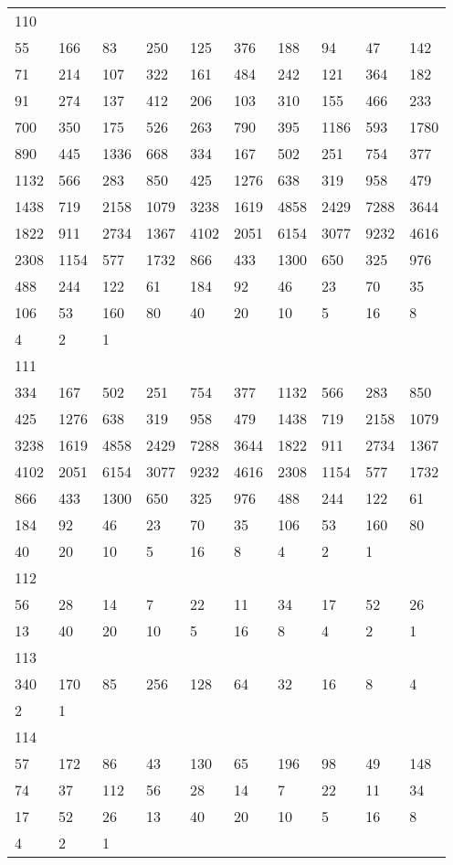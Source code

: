 \begin{longtable}{*{10}{l}}
110&&&&&&&&&\\
55& 166& 83& 250& 125& 376& 188& 94& 47& 142\\
71& 214& 107& 322& 161& 484& 242& 121& 364& 182\\
91& 274& 137& 412& 206& 103& 310& 155& 466& 233\\
700& 350& 175& 526& 263& 790& 395& 1186& 593& 1780\\
890& 445& 1336& 668& 334& 167& 502& 251& 754& 377\\
1132& 566& 283& 850& 425& 1276& 638& 319& 958& 479\\
1438& 719& 2158& 1079& 3238& 1619& 4858& 2429& 7288& 3644\\
1822& 911& 2734& 1367& 4102& 2051& 6154& 3077& 9232& 4616\\
2308& 1154& 577& 1732& 866& 433& 1300& 650& 325& 976\\
488& 244& 122& 61& 184& 92& 46& 23& 70& 35\\
106& 53& 160& 80& 40& 20& 10& 5& 16& 8\\
4& 2& 1& \\

111&&&&&&&&&\\
334& 167& 502& 251& 754& 377& 1132& 566& 283& 850\\
425& 1276& 638& 319& 958& 479& 1438& 719& 2158& 1079\\
3238& 1619& 4858& 2429& 7288& 3644& 1822& 911& 2734& 1367\\
4102& 2051& 6154& 3077& 9232& 4616& 2308& 1154& 577& 1732\\
866& 433& 1300& 650& 325& 976& 488& 244& 122& 61\\
184& 92& 46& 23& 70& 35& 106& 53& 160& 80\\
40& 20& 10& 5& 16& 8& 4& 2& 1& \\

112&&&&&&&&&\\
56& 28& 14& 7& 22& 11& 34& 17& 52& 26\\
13& 40& 20& 10& 5& 16& 8& 4& 2& 1\\

113&&&&&&&&&\\
340& 170& 85& 256& 128& 64& 32& 16& 8& 4\\
2& 1& \\

114&&&&&&&&&\\
57& 172& 86& 43& 130& 65& 196& 98& 49& 148\\
74& 37& 112& 56& 28& 14& 7& 22& 11& 34\\
17& 52& 26& 13& 40& 20& 10& 5& 16& 8\\
4& 2& 1& \\


\end{longtable}
